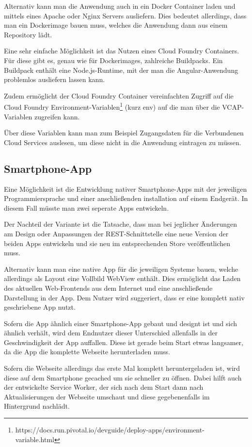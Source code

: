 Alternativ kann man die Anwendung auch in ein Docker Container laden und mittels eines Apache oder Nginx Servers
ausliefern. Dies bedeutet allerdings, dass man ein Dockerimage bauen muss, welches die Anwendung dann aus einem
Repository lädt.

Eine sehr einfache Möglichkeit ist das Nutzen eines Cloud Foundry Containers. Für diese gibt es, genau wie für
Dockerimages, zahlreiche Buildpacks. Ein Buildpack enthält eine Node.js-Runtime, mit der man die Angular-Anwendung
problemlos ausliefern lassen kann.

Zudem ermöglicht der Cloud Foundry Container vereinfachten Zugriff auf die Cloud Foundry
Environment-Variablen\footnote{https://docs.run.pivotal.io/devguide/deploy-apps/environment-variable.html} (kurz env)
auf die man über die VCAP-Variablen zugreifen kann.

Über diese Variablen kann man zum Beispiel Zugangsdaten für die Verbundenen Cloud Services auslesen, um diese nicht in
die Anwendung eintragen zu müssen.

\subsection{Smartphone-App}
Eine Möglichkeit ist die Entwicklung nativer Smartphone-Apps mit der jeweiligen Programmiersprache und einer
anschließenden installation auf einem Endgerät. In diesem Fall müsste man zwei seperate Apps entwickeln.

Der Nachteil der Variante ist die Tatsache, dass man bei jeglicher Änderungen am Design oder Anpassungen der
REST-Schnittstelle eine neue Version der beiden Apps entwickeln und sie neu im entsprechenden Store veröffentlichen
muss.

Alternativ kann man eine native App für die jeweiligen Systeme bauen, welche allerdings als Layout eine Vollbild WebView
enthält. Dies ermöglicht das Laden des aktuellen Web-Frontends aus dem Internet und eine anschließende Darstellung in
der App. Dem Nutzer wird suggeriert, dass er eine komplett nativ geschriebene App nutzt.

Sofern die App ähnlich einer Smartphone-App gebaut und designt ist und sich ähnlich verhält, wird dem Endnutzer dieser
Unterschied allenfalls in der Geschwindigkeit der App auffallen. Diese ist gerade beim Start etwas langsamer, da die
App die komplette Webseite herunterladen muss.

Sofern die Webseite allerdings das erste Mal komplett heruntergeladen ist, wird diese auf dem Smartphone gecached um sie
schneller zu öffnen. Dabei hilft auch der entwickelte Service Worker, der sich nach dem Start dann nach Aktualisierungen
der Webseite umschaut und diese gegebenenfalls im Hintergrund nachlädt.

